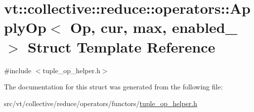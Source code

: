 \hypertarget{structvt_1_1collective_1_1reduce_1_1operators_1_1_apply_op}{}\section{vt\+:\+:collective\+:\+:reduce\+:\+:operators\+:\+:Apply\+Op$<$ Op, cur, max, enabled\+\_\+ $>$ Struct Template Reference}
\label{structvt_1_1collective_1_1reduce_1_1operators_1_1_apply_op}


{\ttfamily \#include $<$tuple\+\_\+op\+\_\+helper.\+h$>$}



The documentation for this struct was generated from the following file\+:\begin{DoxyCompactItemize}
\item 
src/vt/collective/reduce/operators/functors/\hyperlink{tuple__op__helper_8h}{tuple\+\_\+op\+\_\+helper.\+h}\end{DoxyCompactItemize}
